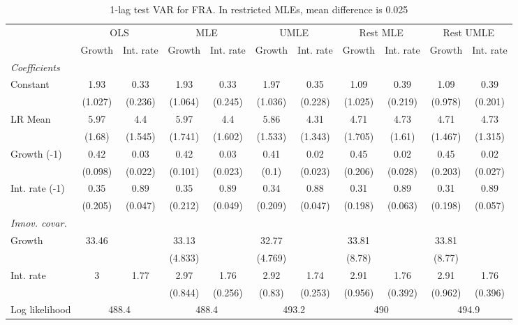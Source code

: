 \begin{table}[htbp] 
	\centering
	\begin{tabular}{@{\extracolsep{4pt}}lcccccccccc@{}}		\hline\hline
		 		 & \multicolumn{2}{c}{OLS} &\multicolumn{2}{c}{MLE} &\multicolumn{2}{c}{UMLE} &\multicolumn{2}{c}{Rest MLE} &\multicolumn{2}{c}{Rest UMLE} \\ 
 		 & Growth 	 & Int. rate 	 & Growth 	 & Int. rate 	 & Growth 	 & Int. rate 	 & Growth 	 & Int. rate 	 & Growth 	 & Int. rate\\\cline{2-3}\cline{4-5}\cline{6-7}\cline{8-9}\cline{10-11}
\rule{0pt}{4ex} 
 \emph{Coefficients} 	  		 & 		 & 		 & 		 & 		 & 		 & 		 & 		 & 		 & 		 &\\ 
\quad Constant 	 & 1.93 	 & 0.33 	 & 1.93 	 & 0.33 	 & 1.97 	 & 0.35 	 & 1.09 	 & 0.39 	 & 1.09 	 & 0.39	 \\ 
 		 & (1.027) 	 & (0.236) 	 & (1.064) 	 & (0.245) 	 & (1.036) 	 & (0.228) 	 & (1.025) 	 & (0.219) 	 & (0.978) 	 & (0.201) 	 \\ 
\quad LR Mean 	 & 5.97 	 & 4.4 	 & 5.97 	 & 4.4 	 & 5.86 	 & 4.31 	 & 4.71 	 & 4.73 	 & 4.71 	 & 4.73	 \\ 
 		 & (1.68) 	 & (1.545) 	 & (1.741) 	 & (1.602) 	 & (1.533) 	 & (1.343) 	 & (1.705) 	 & (1.61) 	 & (1.467) 	 & (1.315) 	 \\ 
\quad Growth (-1) 	 &0.42 	 & 0.03 	 & 0.42 	 & 0.03 	 & 0.41 	 & 0.02 	 & 0.45 	 & 0.02 	 & 0.45 	 & 0.02	 \\ 
 		 & (0.098) 	 & (0.022) 	 & (0.101) 	 & (0.023) 	 & (0.1) 	 & (0.023) 	 & (0.206) 	 & (0.028) 	 & (0.203) 	 & (0.027) 	 \\ 
\quad Int. rate (-1) 	 &0.35 	 & 0.89 	 & 0.35 	 & 0.89 	 & 0.34 	 & 0.88 	 & 0.31 	 & 0.89 	 & 0.31 	 & 0.89	 \\ 
 		 & (0.205) 	 & (0.047) 	 & (0.212) 	 & (0.049) 	 & (0.209) 	 & (0.047) 	 & (0.198) 	 & (0.063) 	 & (0.198) 	 & (0.057) 	 \\ 
\rule{0pt}{4ex} \emph{Innov. covar.}  	 & 	 & 	 & 	 & 	 & 	 & 	 & 	 & 	 & 	 &\\ 
\quad Growth 	 &33.46 	 &  	 & 33.13 	 &  	 & 32.77 	 &  	 & 33.81 	 &  	 & 33.81 	 & 	 \\ 
 		 &  	 &  	 & (4.833) 	 &  	 & (4.769) 	 &  	 & (8.78) 	 &  	 & (8.77) 	 &  	 \\ 
\quad Int. rate 	 &3 	 & 1.77 	 & 2.97 	 & 1.76 	 & 2.92 	 & 1.74 	 & 2.91 	 & 1.76 	 & 2.91 	 & 1.76	 \\ 
 		 &  	 &  	 & (0.844) 	 & (0.256) 	 & (0.83) 	 & (0.253) 	 & (0.956) 	 & (0.392) 	 & (0.962) 	 & (0.396) 	 \\ 
 \hline \rule{0pt}{4ex} 
  Log likelihood 	 &\multicolumn{2}{c}{488.4} 	 & \multicolumn{2}{c}{488.4} 	 & \multicolumn{2}{c}{493.2} 	 & \multicolumn{2}{c}{490} 	 & \multicolumn{2}{c}{494.9}\\ 

 \hline 	\end{tabular}		\caption{1-lag test VAR for FRA. In restricted MLEs, mean difference is 0.025}
		\label{tab:FRA1lag}

\end{table}